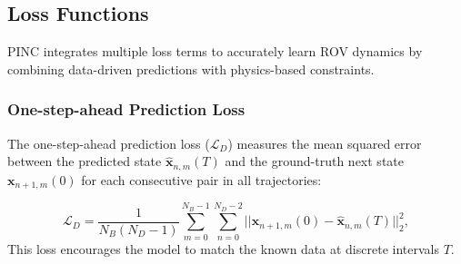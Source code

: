 \subsection{Loss Functions}
\label{sec:loss_funcs}
PINC integrates multiple loss terms to accurately learn ROV dynamics by combining data-driven predictions with physics-based constraints. 

\subsubsection{One-step-ahead Prediction Loss}
The one-step-ahead prediction loss ($\mathcal{L}_D$) measures the mean squared error between the predicted state $\hat{\mathbf{x}}_{n,m}(T)$ and the ground-truth next state $\mathbf{x}_{n+1,m}(0)$ for each consecutive pair in all trajectories:

\begin{equation}
    \mathcal{L}_D = \frac{1}{N_B(N_D-1)} \sum^{N_B-1}_{m=0} \sum^{N_D-2}_{n=0} ||\mathbf{x}_{n+1,m}(0)-\hat{\mathbf{x}}_{n,m}(T)||_2^2,
\end{equation}
This loss encourages the model to match the known data at discrete intervals $T$.

